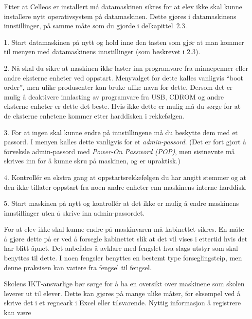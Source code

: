 
Etter at Celleos er installert m\aa{} datamaskinen sikres for at elev ikke skal kunne installere nytt operativsystem p\aa{} datamaskinen. Dette gj\o res i datamaskinens innstillinger, p\aa{} samme m\aa te som du gjorde i delkapittel~2.3. 
\item{1.} Start datamaskinen p\aa{} nytt og hold inne den tasten som gj\o r at man kommer til menyen med datamaskinens innstillinger (som beskrevet i 2.3).
\item{2.} N\aa{} skal du sikre at maskinen ikke laster inn programvare fra minnepenner eller andre eksterne enheter ved oppstart. Menyvalget for dette kalles vanligvis ``boot order'', men ulike produsenter kan bruke ulike navn for dette. Dersom det er mulig \aa{} deaktivere innlasting av programvare fra USB, CDROM og andre eksterne enheter er dette det beste. Hvis ikke dette er mulig m\aa{} du s\o rge for at de eksterne enhetene kommer etter harddisken i rekkef\o lgen. 
\item{3.} For at ingen skal kunne endre p\aa{} innstillingene m\aa{} du beskytte dem med et passord. I menyen kalles dette vanligvis for et {\it admin-passord}. (Det er fort gjort \aa{} forveksle admin-passord med {\it Power-On Password (POP)}, men sistnevnte m\aa{} skrives inn for \aa{} kunne skru p\aa{} maskinen, og er upraktisk.)
\item{4.} Kontroll\'er en ekstra gang at oppstartsrekkef\o lgen du har angitt stemmer og at den ikke tillater oppstart fra noen andre enheter enn maskinens interne harddisk.
\item{5.} Start maskinen p\aa{} nytt og kontroll\'er at det ikke er mulig \aa{} endre maskinens innstillinger uten \aa{} skrive inn admin-passordet.


For at elev ikke skal kunne endre p\aa{} maskinvaren m\aa{} kabinettet sikres. En m\aa te \aa{} gj\o re dette p\aa{} er ved \aa{} forsegle kabinettet slik at det vil vises i ettertid hvis det har blitt \aa pnet. Det anbefales \aa{} avklare med fengslet hva slags utstyr som skal benyttes til dette. I noen fengsler benyttes en bestemt type forseglingsteip, men denne praksisen kan variere fra fengsel til fengsel.


Skolens IKT-ansvarlige b\o r s\o rge for \aa{} ha en oversikt over maskinene som skolen leverer ut til elever. Dette kan gj\o res p\aa{} mange ulike m\aa ter, for eksempel ved \aa{} skrive det i et regneark i Excel eller tilsvarende. Nyttig informasjon \aa{} registrere kan v\ae re

